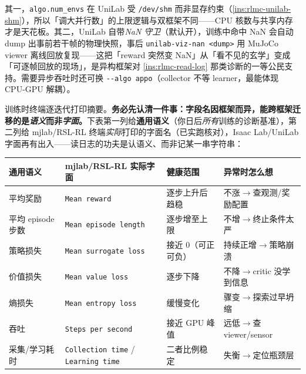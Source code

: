 \begin{note}
其一，\verb|algo.num_envs| 在 UniLab 受 \verb|/dev/shm| 而非显存约束（\cref{ins:rlmc-unilab-shm}），所以「调大并行数」的上限逻辑与双框架不同——CPU 核数与共享内存才是天花板。其二，UniLab 自带\emph{NaN 守卫}（默认开），训练中命中 NaN 会自动 dump 出事前若干帧的物理快照，事后 \verb|unilab-viz-nan <dump>| 用 MuJoCo viewer 离线回放复现——这把「reward 突然变 NaN」从「看不见的玄学」变成「可逐帧回放的现场」，是异构框架对 \cref{ins:rlmc-read-log} 那类诊断的一等公民支持。需要异步吞吐时还可换 \verb|--algo appo|（collector 不等 learner，最能体现 CPU-GPU 解耦）。
\end{note}

训练时终端逐迭代打印摘要。\textbf{务必先认清一件事：字段名因框架而异，能跨框架迁移的是\emph{语义}而非\emph{字面}。}下表第一列给\textbf{通用语义}（你日后\emph{所有}训练的诊断基准），第二列给 mjlab/RSL-RL 终端\emph{实际}打印的字面名（已实跑核对），Isaac Lab/UniLab 字面再有出入——读日志的功夫是认语义、而非记某一串字符串：

\begin{center}
\scriptsize
\begin{tabular}{@{}p{2.0cm}p{2.9cm}p{2.5cm}p{3.4cm}@{}}
\toprule
通用语义 & mjlab/RSL-RL 实际字面 & 健康范围 & 异常时怎么想 \\
\midrule
平均奖励 & \verb|Mean reward| & 逐步上升后趋稳 & 不涨$\to$查观测/奖励配置 \\
平均 episode 步数 & \verb|Mean episode length| & 逐步增至上限 & 不增$\to$终止条件太严 \\
策略损失 & \verb|Mean surrogate loss| & 接近 0（可正可负） & 持续正增$\to$策略崩溃 \\
价值损失 & \verb|Mean value loss| & 逐步下降 & 不降$\to$critic 没学到信息 \\
熵损失 & \verb|Mean entropy loss| & 缓慢变化 & 骤变$\to$探索过早坍缩 \\
吞吐 & \verb|Steps per second| & 接近 GPU 峰值 & 远低$\to$查 viewer/sensor \\
采集/学习耗时 & \verb|Collection time| / \verb|Learning time| & 二者比例稳定 & 失衡$\to$定位瓶颈层 \\
\bottomrule
\end{tabular}
\end{center}

